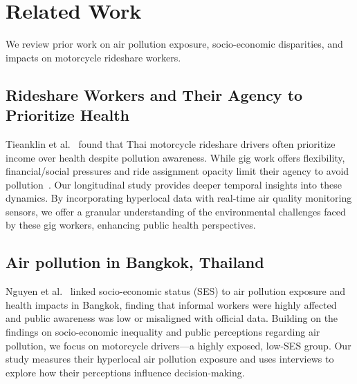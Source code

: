 \section{Related Work}
We review prior work on air pollution exposure, socio-economic disparities, and impacts on motorcycle rideshare workers.


\subsection{Rideshare Workers and Their Agency to Prioritize Health}


Tieanklin et al.~\cite{tieanklin2024rideshare} found that Thai motorcycle rideshare drivers often prioritize income over health despite pollution awareness.
While gig work offers flexibility, financial/social pressures and ride assignment opacity limit their agency to avoid pollution~\cite{machado2021midlife,elfassy2019associations}.
Our longitudinal study provides deeper temporal insights into these dynamics.
By incorporating hyperlocal data with real-time air quality monitoring sensors, we offer a granular understanding of the environmental challenges faced by these gig workers, enhancing public health perspectives.





\subsection{Air pollution in Bangkok, Thailand}
Nguyen et al.~\cite{nguyen2023bangkokpollution} linked socio-economic status (SES) to air pollution exposure and health impacts in Bangkok, finding that informal workers were highly affected and public awareness was low or misaligned with official data.
Building on the findings on socio-economic inequality and public perceptions regarding air pollution, we focus on motorcycle drivers—a highly exposed, low-SES group.
Our study measures their hyperlocal air pollution exposure and uses interviews to explore how their perceptions influence decision-making.

